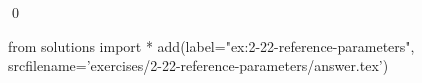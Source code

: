 
\begin{ex}
  \label{ex:2-22-reference-parameters}
  
  \qed
\end{ex}
\begin{python0}
from solutions import *
add(label="ex:2-22-reference-parameters",
    srcfilename='exercises/2-22-reference-parameters/answer.tex')
\end{python0}
